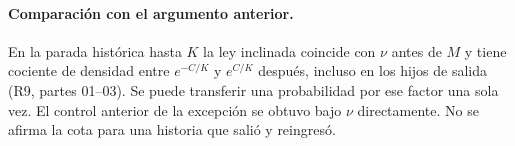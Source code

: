 \paragraph{Comparación con el argumento anterior.}
En la parada histórica hasta $K$ la ley inclinada coincide con $\nu$ antes de $M$
y tiene cociente de densidad entre $e^{-C/K}$ y $e^{C/K}$ después, incluso
en los hijos de salida (R9, partes 01--03). Se puede transferir una probabilidad
por ese factor una sola vez. El control anterior de la excepción se obtuvo bajo
$\nu$ directamente. No se afirma la cota para una historia que salió y reingresó.
